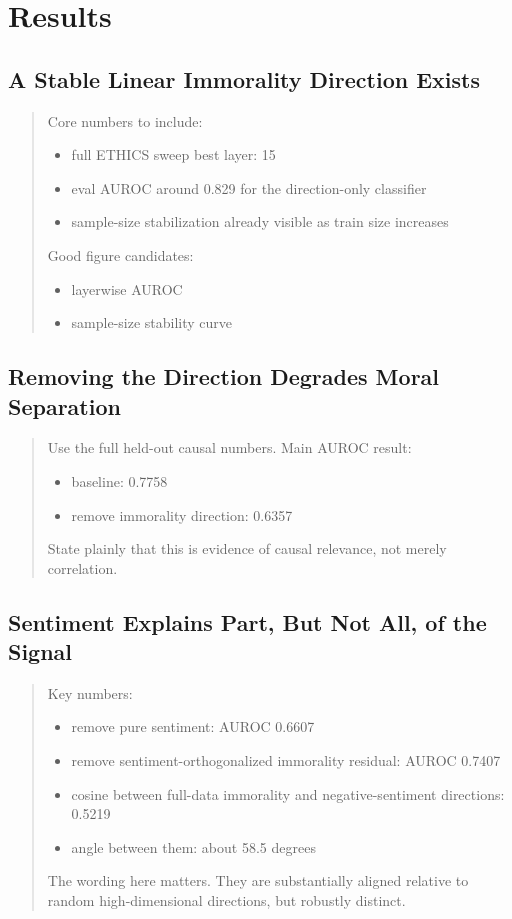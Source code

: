\documentclass[11pt]{article}
\newcommand{\draftnote}[1]{%
  \begin{quote}\footnotesize\color{gray}#1\end{quote}%
}
\begin{document}
\section{Results}
\subsection{A Stable Linear Immorality Direction Exists}
\draftnote{
Core numbers to include:
\begin{itemize}[leftmargin=1.5em]
    \item full ETHICS sweep best layer: 15
    \item eval AUROC around 0.829 for the direction-only classifier
    \item sample-size stabilization already visible as train size increases
\end{itemize}
Good figure candidates:
\begin{itemize}[leftmargin=1.5em]
    \item layerwise AUROC
    \item sample-size stability curve
\end{itemize}
}

\subsection{Removing the Direction Degrades Moral Separation}
\draftnote{
Use the full held-out causal numbers.
Main AUROC result:
\begin{itemize}[leftmargin=1.5em]
    \item baseline: 0.7758
    \item remove immorality direction: 0.6357
\end{itemize}
State plainly that this is evidence of causal relevance, not merely correlation.
}

\subsection{Sentiment Explains Part, But Not All, of the Signal}
\draftnote{
Key numbers:
\begin{itemize}[leftmargin=1.5em]
    \item remove pure sentiment: AUROC 0.6607
    \item remove sentiment-orthogonalized immorality residual: AUROC 0.7407
    \item cosine between full-data immorality and negative-sentiment directions: 0.5219
    \item angle between them: about 58.5 degrees
\end{itemize}
The wording here matters. They are substantially aligned relative to random high-dimensional directions, but robustly distinct.
}
\end{document}
